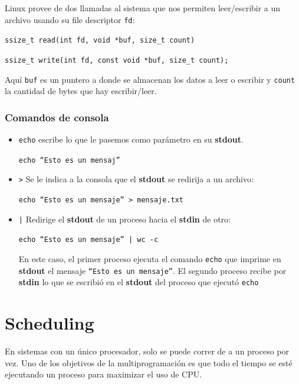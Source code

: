     Linux provee de dos llamadas al sistema que nos permiten leer/escribir a un archivo usando su file descriptor \texttt{fd}:
    
    \begin{center}
        \texttt{ssize\_t read(int fd, void *buf, size\_t count)}

        \texttt{ssize\_t write(int fd, const void *buf, size\_t count);}
    \end{center}
    
Aquí \texttt{buf} es un puntero a donde se almacenan los datos a leer o escribir y \texttt{count} la cantidad de bytes que hay escribir/leer.

\subsubsection{Comandos de consola}
\begin{itemize}
    \item \texttt{echo} escribe lo que le pasemos como parámetro en su \textbf{stdout}.
    \begin{center}
        \texttt{echo ``Esto es un mensaj''}	\end{center}
    \item \texttt{>} Se le indica a la consola que el \textbf{stdout} se redirija a un archivo:
    \begin{center}
        \texttt{echo ``Esto es un mensaje'' > mensaje.txt}
    \end{center}
    \item \texttt{|} Redirige el \textbf{stdout} de un proceso hacia el \textbf{stdin} de otro:
    
    \begin{center}
        \texttt{echo ``Esto es un mensaje'' | wc -c}
    \end{center}

    En este caso, el primer proceso ejecuta el comando \texttt{echo} que imprime en \textbf{stdout} el mensaje \texttt{``Esto es un mensaje''}. El segundo proceso recibe por \textbf{stdin} lo que se escribió en el \textbf{stdout} del proceso que ejecutó \texttt{echo}
\end{itemize}
\printbibliography[keyword=procesos,title=Bibliografía]

\newpage
    
\section{Scheduling} 
    En sistemas con un único procesador, solo se puede correr de a un proceso por vez. Uno de los objetivos de la multiprogramación es que todo el tiempo se esté ejecutando un proceso para maximizar el uso de CPU.
    
